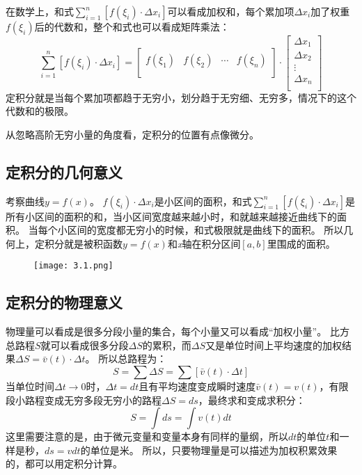 在数学上，和式$\sum_{i=1}^n{\left[ f\left( \xi _i \right) \cdot \Delta x_i \right]}$可以看成加权和，每个累加项$\Delta x_i$加了权重$f\left( \xi _i \right) $后的代数和，整个和式也可以看成矩阵乘法：
\[
\sum_{i=1}^n{\left[ f\left( \xi _i \right) \cdot \Delta x_i \right]}=\left[ \begin{matrix}
	f\left( \xi _1 \right)&		f\left( \xi _2 \right)&		\cdots&		f\left( \xi _n \right)\\
\end{matrix} \right] \cdot \left[ \begin{array}{c}
	\Delta x_1\\
	\Delta x_2\\
	\vdots\\
	\Delta x_n\\
\end{array} \right]
\]
定积分就是当每个累加项都趋于无穷小，划分趋于无穷细、无穷多，情况下的这个代数和的极限。

\begin{tcolorbox}
从忽略高阶无穷小量的角度看，定积分的位置有点像微分。
\end{tcolorbox}

\subsection{定积分的几何意义}

考察曲线$y=f\left( x \right) $。
$f\left( \xi _i \right) \cdot \Delta x_i$是小区间的面积，和式$\sum_{i=1}^n{\left[ f\left( \xi _i \right) \cdot \Delta x_i \right]}$是所有小区间的面积的和，当小区间宽度越来越小时，和就越来越接近曲线下的面积。
当每个小区间的宽度都无穷小的时候，和式极限就是曲线下的面积。
所以几何上，定积分就是被积函数$y=f\left( x \right) $和{\it x}轴在积分区间$\left[ a,b \right] $里围成的面积。
\begin{figure}[h]
\centering
\texttt{[image: 3.1.png]}
\end{figure}

\subsection{定积分的物理意义}

物理量可以看成是很多分段小量的集合，每个小量又可以看成“加权小量”。
比方总路程$S$就可以看成很多分段$\Delta S$的累积，而$\Delta S$又是单位时间上平均速度的加权结果$\Delta S=\bar{v}\left( t \right) \cdot \Delta t$。
所以总路程为：
\[
S=\sum{\Delta S}=\sum{\left[ \bar{v}\left( t \right) \cdot \Delta t \right]}
\]
当单位时间$\Delta t\rightarrow 0$时，$\Delta t=dt$且有平均速度变成瞬时速度$\bar{v}\left( t \right) =v\left( t \right) $，有限段小路程变成无穷多段无穷小的路程$\Delta S=ds$，最终求和变成求积分：
\[
S=\int{ds}=\int{v\left( t \right) dt}
\]
这里需要注意的是，由于微元变量和变量本身有同样的量纲，所以$dt$的单位$t$和一样是秒，$ds=vdt$的单位是米。
所以，只要物理量是可以描述为加权积累效果的，都可以用定积分计算。




